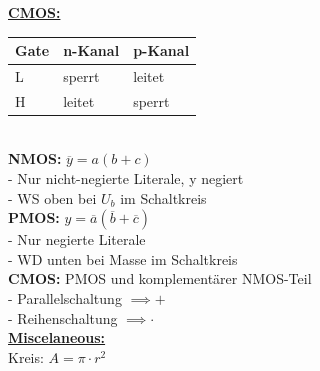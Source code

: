 \documentclass[8pt]{extarticle}
\begin{document}
\begin{minipage}{0.33\textwidth}
\underline{\textbf{CMOS:}}\\
\begin{tabular}{l|ll}
    Gate & n-Kanal & p-Kanal \\
    \hline
    L & sperrt & leitet \\
    H & leitet & sperrt
\end{tabular}
\\
\textbf{NMOS:} $\overline{y} = a(b+c)$ \\
- Nur nicht-negierte Literale, y negiert \\
- WS oben bei $U_b$ im Schaltkreis\\
\textbf{PMOS:} $y = \overline{a}(\overline{b} + \overline{c})$ \\
- Nur negierte Literale \\
- WD unten bei Masse im Schaltkreis\\
\textbf{CMOS:} PMOS und komplementärer NMOS-Teil\\
- Parallelschaltung $\implies +$ \\
- Reihenschaltung \hspace{0.1mm} $\implies \mathbf{\cdot}$ \\

\underline{\textbf{Miscelaneous:}}\\
Kreis: $A = \pi \cdot r^2$\\

\end{minipage}
~~~~~~~
\end{document}
